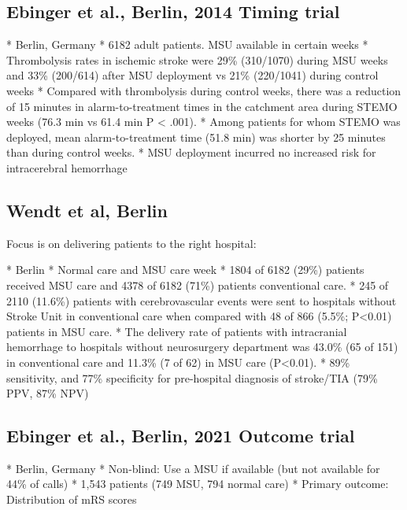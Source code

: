 \subsection{Ebinger et al., Berlin, 2014 Timing trial \cite{ebinger_effect_2014}}

\begin{markdown}
* Berlin, Germany
* 6182 adult patients. MSU available in certain weeks
* Thrombolysis rates in ischemic stroke were 29\% (310/1070) during MSU weeks and 33\% (200/614) after MSU deployment vs 21\% (220/1041) during control weeks
* Compared with thrombolysis during control weeks, there was a reduction of 15 minutes in alarm-to-treatment times in the catchment area during STEMO weeks (76.3 min vs 61.4 min P < .001).
* Among patients for whom STEMO was deployed, mean alarm-to-treatment time (51.8 min) was shorter by 25 minutes than during control weeks.
* MSU deployment incurred no increased risk for intracerebral hemorrhage 
\end{markdown}

\subsection{Wendt  et al, Berlin \cite{wendt_improved_2015}}

Focus is on delivering patients to the right hospital:

\begin{markdown}
* Berlin
* Normal care and MSU care week
* 1804 of 6182 (29\%) patients received MSU care and 4378 of 6182 (71\%) patients conventional care.
* 245 of 2110 (11.6\%) patients with cerebrovascular events were sent to hospitals without Stroke Unit in conventional care when compared with 48 of 866 (5.5\%; P<0.01) patients in MSU care.
* The delivery rate of patients with intracranial hemorrhage to hospitals without neurosurgery department was 43.0\% (65 of 151) in conventional care and 11.3\% (7 of 62) in MSU care (P<0.01).
* 89\% sensitivity, and 77\% specificity for pre-hospital diagnosis of stroke/TIA (79\% PPV, 87\% NPV)
\end{markdown}



\subsection{Ebinger et al., Berlin, 2021 Outcome trial \cite{ebinger_association_2021}}

\begin{markdown}
* Berlin, Germany
* Non-blind: Use a MSU if available (but not available for 44\% of calls)
* 1,543 patients (749 MSU, 794 normal care)
* Primary outcome: Distribution of mRS scores
\end{markdown}

